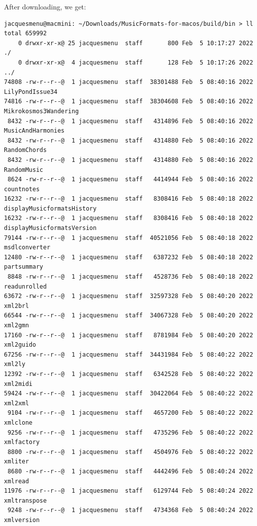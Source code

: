 After downloading, we get:
\begin{lstlisting}[language=Terminal]
jacquesmenu@macmini: ~/Downloads/MusicFormats-for-macos/build/bin > ll
total 659992
    0 drwxr-xr-x@ 25 jacquesmenu  staff       800 Feb  5 10:17:27 2022 ./
    0 drwxr-xr-x@  4 jacquesmenu  staff       128 Feb  5 10:17:26 2022 ../
74808 -rw-r--r--@  1 jacquesmenu  staff  38301488 Feb  5 08:40:16 2022 LilyPondIssue34
74816 -rw-r--r--@  1 jacquesmenu  staff  38304608 Feb  5 08:40:16 2022 Mikrokosmos3Wandering
 8432 -rw-r--r--@  1 jacquesmenu  staff   4314896 Feb  5 08:40:16 2022 MusicAndHarmonies
 8432 -rw-r--r--@  1 jacquesmenu  staff   4314880 Feb  5 08:40:16 2022 RandomChords
 8432 -rw-r--r--@  1 jacquesmenu  staff   4314880 Feb  5 08:40:16 2022 RandomMusic
 8624 -rw-r--r--@  1 jacquesmenu  staff   4414944 Feb  5 08:40:16 2022 countnotes
16232 -rw-r--r--@  1 jacquesmenu  staff   8308416 Feb  5 08:40:18 2022 displayMusicformatsHistory
16232 -rw-r--r--@  1 jacquesmenu  staff   8308416 Feb  5 08:40:18 2022 displayMusicformatsVersion
79144 -rw-r--r--@  1 jacquesmenu  staff  40521056 Feb  5 08:40:18 2022 msdlconverter
12480 -rw-r--r--@  1 jacquesmenu  staff   6387232 Feb  5 08:40:18 2022 partsummary
 8848 -rw-r--r--@  1 jacquesmenu  staff   4528736 Feb  5 08:40:18 2022 readunrolled
63672 -rw-r--r--@  1 jacquesmenu  staff  32597328 Feb  5 08:40:20 2022 xml2brl
66544 -rw-r--r--@  1 jacquesmenu  staff  34067328 Feb  5 08:40:20 2022 xml2gmn
17160 -rw-r--r--@  1 jacquesmenu  staff   8781984 Feb  5 08:40:20 2022 xml2guido
67256 -rw-r--r--@  1 jacquesmenu  staff  34431984 Feb  5 08:40:22 2022 xml2ly
12392 -rw-r--r--@  1 jacquesmenu  staff   6342528 Feb  5 08:40:22 2022 xml2midi
59424 -rw-r--r--@  1 jacquesmenu  staff  30422064 Feb  5 08:40:22 2022 xml2xml
 9104 -rw-r--r--@  1 jacquesmenu  staff   4657200 Feb  5 08:40:22 2022 xmlclone
 9256 -rw-r--r--@  1 jacquesmenu  staff   4735296 Feb  5 08:40:22 2022 xmlfactory
 8800 -rw-r--r--@  1 jacquesmenu  staff   4504976 Feb  5 08:40:22 2022 xmliter
 8680 -rw-r--r--@  1 jacquesmenu  staff   4442496 Feb  5 08:40:24 2022 xmlread
11976 -rw-r--r--@  1 jacquesmenu  staff   6129744 Feb  5 08:40:24 2022 xmltranspose
 9248 -rw-r--r--@  1 jacquesmenu  staff   4734368 Feb  5 08:40:24 2022 xmlversion
\end{lstlisting}

